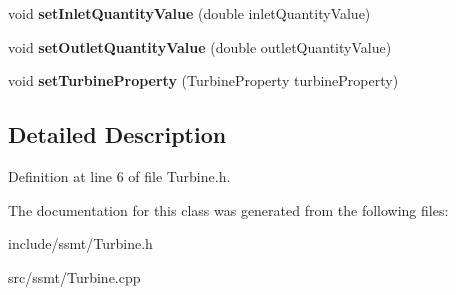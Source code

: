\begin{DoxyCompactItemize}
\item 
\mbox{\label{class_turbine_ac01a053462c83e21ecc2158e75477542}} 
void {\bfseries set\+Inlet\+Quantity\+Value} (double inlet\+Quantity\+Value)
\item 
\mbox{\label{class_turbine_ab37326068f633280de8f8144b9c8eb89}} 
void {\bfseries set\+Outlet\+Quantity\+Value} (double outlet\+Quantity\+Value)
\item 
\mbox{\label{class_turbine_abb3f16cefe52f4e9c7b32b2bb17a68ee}} 
void {\bfseries set\+Turbine\+Property} (Turbine\+Property turbine\+Property)
\end{DoxyCompactItemize}


\subsection{Detailed Description}


Definition at line 6 of file Turbine.\+h.



The documentation for this class was generated from the following files\+:\begin{DoxyCompactItemize}
\item 
include/ssmt/Turbine.\+h\item 
src/ssmt/Turbine.\+cpp\end{DoxyCompactItemize}
